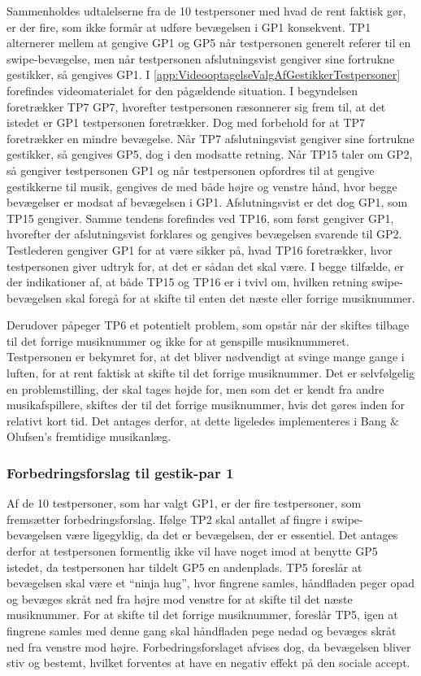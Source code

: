 Sammenholdes udtalelserne fra de 10 testpersoner med hvad de rent faktisk gør, er der fire, som ikke formår at udføre bevægelsen i GP1 konsekvent. TP1 alternerer mellem at gengive GP1 og GP5 når testpersonen generelt referer til en swipe-bevægelse, men når testpersonen afslutningsvist gengiver sine fortrukne gestikker, så gengives GP1. I \autoref{app:VideooptagelseValgAfGestikkerTestpersoner} forefindes videomaterialet for den pågældende situation. I begyndelsen foretrækker TP7 GP7, hvorefter testpersonen ræsonnerer sig frem til, at det istedet er GP1 testpersonen foretrækker. Dog med forbehold for at TP7 foretrækker en mindre bevægelse. Når TP7 afslutningsvist gengiver sine fortrukne gestikker, så gengives GP5, dog i den modsatte retning. Når TP15 taler om GP2, så gengiver testpersonen GP1 og når testpersonen opfordres til at gengive gestikkerne til musik, gengives de med både højre og venstre hånd, hvor begge bevægelser er modsat af bevægelsen i GP1. Afslutningsvist er det dog GP1, som TP15 gengiver. Samme tendens forefindes ved TP16, som først gengiver GP1, hvorefter der afslutningsvist forklares og gengives bevægelsen svarende til GP2. Testlederen gengiver GP1 for at være sikker på, hvad TP16 foretrækker, hvor testpersonen giver udtryk for, at det er sådan det skal være. I begge tilfælde, er der indikationer af, at både TP15 og TP16 er i tvivl om, hvilken retning swipe-bevægelsen skal foregå for at skifte til enten det næste eller forrige musiknummer.

Derudover påpeger TP6 et potentielt problem, som opstår når der skiftes tilbage til det forrige musiknummer og ikke for at genspille musiknummeret. Testpersonen er bekymret for, at det bliver nødvendigt at svinge mange gange i luften, for at rent faktisk at skifte til det forrige musiknummer. Det er selvfølgelig en problemstilling, der skal tages højde for, men som det er kendt fra andre musikafspillere, skiftes der til det forrige musiknummer, hvis det gøres inden for relativt kort tid. Det antages derfor, at dette ligeledes implementeres i Bang $\&$ Olufsen's fremtidige musikanlæg. 
%
\subsubsection{Forbedringsforslag til gestik-par 1}
\label{TestresultaterValgAfGestikkerForbedringGP1Skift}
%
Af de 10 testpersoner, som har valgt GP1, er der fire testpersoner, som fremsætter forbedringsforslag. Ifølge TP2 skal antallet af fingre i swipe-bevægelsen være ligegyldig, da det er bevægelsen, der er essentiel. Det antages derfor at testpersonen formentlig ikke vil have noget imod at benytte GP5 istedet, da testpersonen har tildelt GP5 en andenplads. TP5 foreslår at bevægelsen skal være et \enquote{ninja hug}, hvor fingrene samles, håndfladen peger opad og bevæges skråt ned fra højre mod venstre for at skifte til det næste musiknummer. For at skifte til det forrige musiknummer, foreslår TP5, igen at fingrene samles med denne gang skal håndfladen pege nedad og bevæges skråt ned fra venstre mod højre. Forbedringsforslaget afvises dog, da bevægelsen bliver stiv og bestemt, hvilket forventes at have en negativ effekt på den sociale accept.

